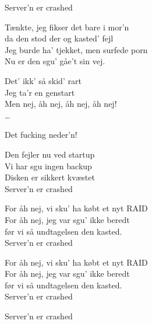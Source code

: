 \begin{song}{Server'n er crashed}
  \begin{SBSection*}
    Tænkte, jeg fikser det bare i mor'n\\
    da den stod der og kasted' fejl\\
    Jeg burde ha' tjekket, men surfede porn\\
    Nu er den sgu' gåe't sin vej.
  \end{SBSection*}

  \begin{SBVerse}
    Det' ikk' så skid' rart\\
    Jeg ta'r en genstart\\
    Men nej, åh nej, åh nej, åh nej!\\
    \ldots
  \end{SBVerse}

  \begin{SBSection*}
    Det fucking neder'n!
  \end{SBSection*}

  \begin{SBSection*}
    Den fejler nu ved startup\\
    Vi har sgu ingen backup\\
    Disken er sikkert kvæstet\\
    Server'n er crashed
  \end{SBSection*}

  \begin{SBChorus}
    For åh nej, vi sku' ha købt et nyt RAID\\
    For åh nej, jeg var sgu' ikke beredt\\
    før vi så undtagelsen den kasted.\\
    Server'n er crashed
  \end{SBChorus}

  \begin{SBChorus}
    For åh nej, vi sku' ha købt et nyt RAID\\
    For åh nej, jeg var sgu' ikke beredt\\
    før vi så undtagelsen den kasted.\\
    Server'n er crashed
  \end{SBChorus}



  \begin{SBSection*}
    Server'n er crashed
  \end{SBSection*}
\end{song}